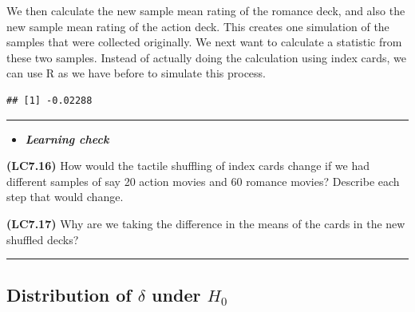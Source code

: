\documentclass[]{tufte-book}
\newenvironment{Shaded}{\begin{snugshade}}{\end{snugshade}}
\newcommand{\KeywordTok}[1]{\textcolor[rgb]{0.13,0.29,0.53}{\textbf{{#1}}}}
\newcommand{\DataTypeTok}[1]{\textcolor[rgb]{0.13,0.29,0.53}{{#1}}}
\newcommand{\StringTok}[1]{\textcolor[rgb]{0.31,0.60,0.02}{{#1}}}
\newcommand{\NormalTok}[1]{{#1}}
\let\oldrule=\rule
\renewcommand{\rule}[1]{\oldrule{\linewidth}}
\newenvironment{rmdblock}[1]
  {\begin{shaded*}
  \begin{itemize}
  \renewcommand{\labelitemi}{
    \raisebox{-.7\height}[0pt][0pt]{
    }
  }
  \item
  }
  {
  \end{itemize}
  \end{shaded*}
  }
\newenvironment{learncheck}
  {\begin{rmdblock}{warning}}
  {\end{rmdblock}}
\theoremstyle{definition}
\theoremstyle{definition}
\theoremstyle{remark}
\begin{document}
We then calculate the new sample mean rating of the romance deck, and
also the new sample mean rating of the action deck. This creates one
simulation of the samples that were collected originally. We next want
to calculate a statistic from these two samples. Instead of actually
doing the calculation using index cards, we can use R as we have before
to simulate this process.

\begin{Shaded}
\end{Shaded}

\begin{verbatim}
## [1] -0.02288
\end{verbatim}

\begin{center}\rule{0.5\linewidth}{\linethickness}\end{center}

\begin{learncheck}
\textbf{\emph{Learning check}}
\end{learncheck}

\textbf{(LC7.16)} How would the tactile shuffling of index cards change
if we had different samples of say 20 action movies and 60 romance
movies? Describe each step that would change.

\textbf{(LC7.17)} Why are we taking the difference in the means of the
cards in the new shuffled decks?

\begin{center}\rule{0.5\linewidth}{\linethickness}\end{center}

\subsection{\texorpdfstring{Distribution of \(\delta\) under
\(H_0\)}{Distribution of \textbackslash{}delta under H\_0}}\label{distribution-of-delta-under-h_0-1}
\end{document}

